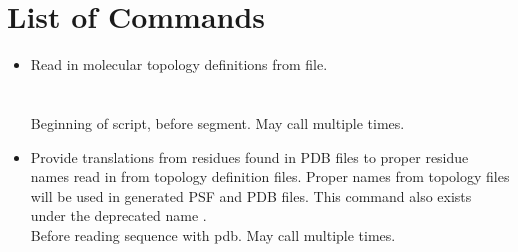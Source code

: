 \section{List of Commands}

\begin{itemize}

\item {}
{Read in molecular topology definitions from file.}
{\\
\\
\\
}
{Beginning of script, before segment.  May call multiple times.}

\item {}
{Provide translations from residues found in PDB files to proper
residue names read in from topology definition files.  Proper names
from topology files will be used in generated PSF and PDB files.
This command also exists under the deprecated name .}
{\\
}
{Before reading sequence with pdb.  May call multiple times.}


\end{itemize}
